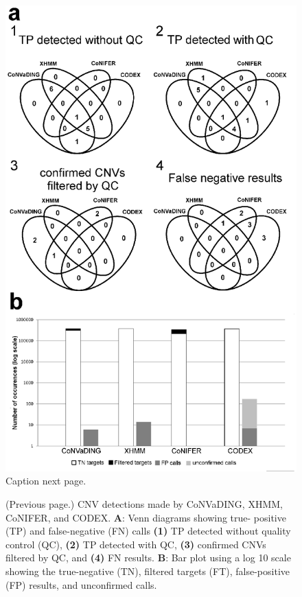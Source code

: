 \begin{figure}
	\includegraphics[width=0.9\linewidth]{img/CoNVaDING_Fig3}
	\caption[CNV detections CoNVaDING, XHMM, CoNIFER, and CODEX]{Caption next page.}
	\label{fig:CoNVaDING_Fig3}
\end{figure}
\addtocounter{figure}{-1}
\begin{figure}
	\caption[]{(Previous page.) CNV detections made by CoNVaDING, XHMM, CoNIFER, and CODEX. \textbf{A}: Venn diagrams showing true- positive (TP) and false-negative (FN) calls \textbf{(1)} TP detected without quality control (QC), \textbf{(2)} TP detected with QC, \textbf{(3)} confirmed CNVs filtered by QC, and \textbf{(4)} FN results. \textbf{B}: Bar plot using a log 10 scale showing the true-negative (TN), filtered targets (FT), false-positive (FP) results, and unconfirmed calls.}
\end{figure}

